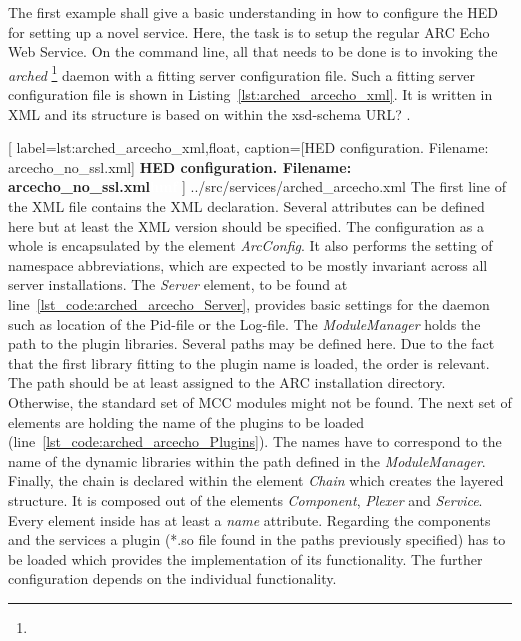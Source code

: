 The first example shall give a basic understanding in how to configure the HED for setting up a novel service.
Here, the task is to setup the regular ARC Echo Web Service.
On the command line, all that needs to be done is to invoking the \textit{arched}%
\footnote{}
daemon with a fitting server configuration file.
Such a fitting server configuration file is shown in Listing~\ref{lst:arched_arcecho_xml}.
It is written in XML and its structure is based on within the xsd-schema \textcolor{urgent}{URL?} .


	[
	label=lst:arched_arcecho_xml,float,
	caption={[HED configuration. Filename: arcecho\_no\_ssl.xml]
	\textbf{HED configuration. Filename: arcecho\_no\_ssl.xml\textcolor{white}{hmf}}}
	]
{../src/services/arched_arcecho.xml}
The first line of the XML file contains the XML declaration.
Several attributes can be defined here but at least the XML version should be specified.
The configuration as a whole is encapsulated by the element \textit{ArcConfig}. It also performs the setting of namespace abbreviations, which are expected to be mostly invariant across all server installations.%
The \textit{Server} element, to be found at line~\ref{lst_code:arched_arcecho_Server}, provides basic settings for the daemon such as location of the Pid-file or the Log-file.
The \textit{ModuleManager} holds the path to the plugin libraries.
Several paths may be defined here.
Due to the fact that the first library fitting to the plugin name is loaded, the order is relevant.
The path should be at least assigned to the ARC installation directory.
Otherwise, the standard set of MCC modules might not be found.
The next set of elements are holding the name of the plugins to be loaded (line~\ref{lst_code:arched_arcecho_Plugins}).
The names have to correspond to the name of the dynamic libraries within the path defined in the \textit{ModuleManager}.
Finally, the chain is declared within the element \textit{Chain} which creates the layered structure.
It is composed out of the elements \textit{Component}, \textit{Plexer} and \textit{Service}.
Every element inside has at least a \textit{name} attribute.
Regarding the components and the services a plugin (*.so file found in the paths previously specified) has to be loaded which provides the implementation of its functionality. The further configuration depends on the individual functionality.\\
%
